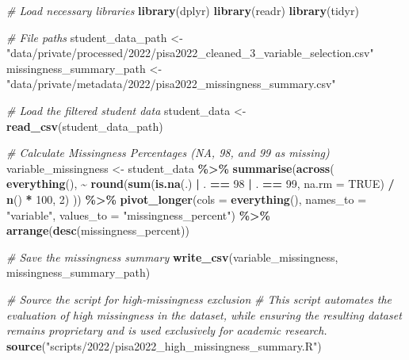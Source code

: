 \documentclass[
]{article}
\newenvironment{Shaded}{\begin{snugshade}}{\end{snugshade}}
\newcommand{\AttributeTok}[1]{\textcolor[rgb]{0.13,0.29,0.53}{#1}}
\newcommand{\CommentTok}[1]{\textcolor[rgb]{0.56,0.35,0.01}{\textit{#1}}}
\newcommand{\ConstantTok}[1]{\textcolor[rgb]{0.56,0.35,0.01}{#1}}
\newcommand{\DecValTok}[1]{\textcolor[rgb]{0.00,0.00,0.81}{#1}}
\newcommand{\FunctionTok}[1]{\textcolor[rgb]{0.13,0.29,0.53}{\textbf{#1}}}
\newcommand{\NormalTok}[1]{#1}
\newcommand{\OtherTok}[1]{\textcolor[rgb]{0.56,0.35,0.01}{#1}}
\newcommand{\SpecialCharTok}[1]{\textcolor[rgb]{0.81,0.36,0.00}{\textbf{#1}}}
\newcommand{\StringTok}[1]{\textcolor[rgb]{0.31,0.60,0.02}{#1}}
\begin{document}
\begin{Shaded}
\begin{Highlighting}[]
\CommentTok{\# Load necessary libraries}
\FunctionTok{library}\NormalTok{(dplyr)}
\FunctionTok{library}\NormalTok{(readr)}
\FunctionTok{library}\NormalTok{(tidyr)}

\CommentTok{\# File paths}
\NormalTok{student\_data\_path }\OtherTok{\textless{}{-}} \StringTok{"data/private/processed/2022/pisa2022\_cleaned\_3\_variable\_selection.csv"}
\NormalTok{missingness\_summary\_path }\OtherTok{\textless{}{-}} \StringTok{"data/private/metadata/2022/pisa2022\_missingness\_summary.csv"}

\CommentTok{\# Load the filtered student data}
\NormalTok{student\_data }\OtherTok{\textless{}{-}} \FunctionTok{read\_csv}\NormalTok{(student\_data\_path)}

\CommentTok{\# Calculate Missingness Percentages (NA, 98, and 99 as missing)}
\NormalTok{variable\_missingness }\OtherTok{\textless{}{-}}\NormalTok{ student\_data }\SpecialCharTok{\%\textgreater{}\%}
  \FunctionTok{summarise}\NormalTok{(}\FunctionTok{across}\NormalTok{(}
    \FunctionTok{everything}\NormalTok{(),}
    \SpecialCharTok{\textasciitilde{}} \FunctionTok{round}\NormalTok{(}\FunctionTok{sum}\NormalTok{(}\FunctionTok{is.na}\NormalTok{(.) }\SpecialCharTok{|}\NormalTok{ . }\SpecialCharTok{==} \DecValTok{98} \SpecialCharTok{|}\NormalTok{ . }\SpecialCharTok{==} \DecValTok{99}\NormalTok{, }\AttributeTok{na.rm =} \ConstantTok{TRUE}\NormalTok{) }\SpecialCharTok{/} \FunctionTok{n}\NormalTok{() }\SpecialCharTok{*} \DecValTok{100}\NormalTok{, }\DecValTok{2}\NormalTok{)}
\NormalTok{  )) }\SpecialCharTok{\%\textgreater{}\%}
  \FunctionTok{pivot\_longer}\NormalTok{(}\AttributeTok{cols =} \FunctionTok{everything}\NormalTok{(), }\AttributeTok{names\_to =} \StringTok{"variable"}\NormalTok{, }\AttributeTok{values\_to =} \StringTok{"missingness\_percent"}\NormalTok{) }\SpecialCharTok{\%\textgreater{}\%}
  \FunctionTok{arrange}\NormalTok{(}\FunctionTok{desc}\NormalTok{(missingness\_percent))}

\CommentTok{\# Save the missingness summary}
\FunctionTok{write\_csv}\NormalTok{(variable\_missingness, missingness\_summary\_path)}
\end{Highlighting}
\end{Shaded}

\begin{Shaded}
\begin{Highlighting}[]
\CommentTok{\# Source the script for high{-}missingness exclusion}
\CommentTok{\# This script automates the evaluation of high missingness in the dataset, while ensuring the resulting dataset remains proprietary and is used exclusively for academic research.}
\FunctionTok{source}\NormalTok{(}\StringTok{"scripts/2022/pisa2022\_high\_missingness\_summary.R"}\NormalTok{)}
\end{Highlighting}
\end{Shaded}
\end{document}

